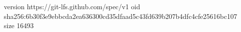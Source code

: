 version https://git-lfs.github.com/spec/v1
oid sha256:6b30f3e9ebbcda2ea636300cd35dfaad5c43fd639b207b4dfc4cfe25616bc107
size 16493
